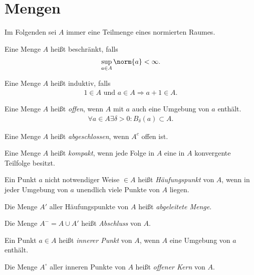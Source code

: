 \section{Mengen}

Im Folgenden sei $A$ immer eine Teilmenge eines normierten Raumes.

\begin{defn}
Eine Menge $A$ heißt beschränkt, falls
\begin{align*}
\sup\limits_{a\in A} \norm{a} < \infty.
\end{align*}
\end{defn}
\begin{defn}
Eine Menge $A$ heißt induktiv, falls
\begin{align*}
1\in A \text{ und } a \in A \Rightarrow a+1\in A.  
\end{align*}
\end{defn}
\begin{defn}
Eine Menge $A$ heißt \emph{offen}, wenn $A$ mit $a$ auch eine Umgebung von $a$
enthält.
\begin{align*}
\forall a\in A \exists \delta > 0 : B_\delta(a) \subset A.
\end{align*}
\end{defn}
\begin{defn}
Eine Menge $A$ heißt \emph{abgeschlossen}, wenn $A^c$
offen ist.
\end{defn}
\begin{defn}
Eine Menge $A$ heißt \emph{kompakt}, wenn jede Folge in $A$ eine in $A$
konvergente Teilfolge besitzt.
\end{defn}
\begin{defn}
Ein Punkt $a$ nicht notwendiger Weise $\in A$ heißt \emph{Häufungspunkt} von
$A$, wenn in jeder Umgebung von $a$ unendlich viele Punkte von $A$ liegen.
\end{defn}
\begin{defn}
Die Menge $A'$ aller Häufungspunkte von $A$ heißt \emph{abgeleitete
Menge}.
\end{defn}
\begin{defn}
Die Menge $A^{-} = A \cup A'$ heißt \emph{Abschluss} von $A$.
\end{defn}
\begin{defn}
Ein Punkt $a\in A$ heißt \emph{innerer Punkt} von $A$, wenn $A$ eine Umgebung
von $a$ enthält.
\end{defn}
\begin{defn}
Die Menge $A^\circ$ aller inneren Punkte von $A$ heißt \emph{offener Kern} von
$A$.
\end{defn}
